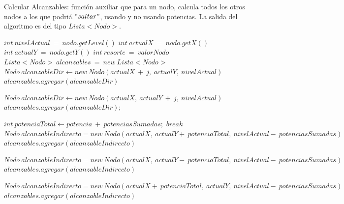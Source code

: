 \vspace{10mm}		
Calcular Alcanzables: funci\'on auxiliar que para un nodo, calcula todos los otros nodos a los que podri\'a $"saltar"$, usando y no usando potencias. La salida del algoritmo es del tipo $Lista<Nodo>$.
\vspace{2mm}
\begin{algorithmic}[1]
		\State $int\: nivelActual\: =\: nodo.getLevel()$
		\State $int\: actualX\: =\: nodo.getX()$
		\State $int\: actualY\: =\: nodo.getY()$
		\State $int\: resorte\: =\: valorNodo$
		\State $Lista<Nodo>\: alcanzables\: =\: new\: Lista<Nodo>$
				\State $Nodo\: alcanzableDir\gets new\: Nodo(actualX\: +\: j,\: actualY, \:nivelActual)$
				\State $alcanzables.agregar(alcanzableDir)$
			\EndIf
				
				\State $Nodo\: alcanzableDir \gets new \:Nodo(actualX, \:actualY\: + \:j, \:nivelActual)$
				\State $alcanzables.agregar(alcanzableDir);$
			\EndIf
		\EndFor

			\State $int\: potenciaTotal \gets potencia\: +\: potenciasSumadas; $
				\State $break$
			\EndIf
				\State $Nodo\: alcanzableIndirecto = new\: Nodo(actualX,\: actualY +\: potenciaTotal, \:nivelActual - \:potenciasSumadas)$
				\State $alcanzables.agregar(alcanzableIndirecto)$
			\EndIf

				\State $Nodo\: alcanzableIndirecto = new\: Nodo(actualX,\: actualY -\: potenciaTotal, \:nivelActual - \:potenciasSumadas)$
				\State $alcanzables.agregar(alcanzableIndirecto)$
			\EndIf

				\State $Nodo\: alcanzableIndirecto = new\: Nodo(actualX  +\: potenciaTotal,\: actualY, \:nivelActual - \:potenciasSumadas)$
				\State $alcanzables.agregar(alcanzableIndirecto)$
			\EndIf


\end{algorithmic}
